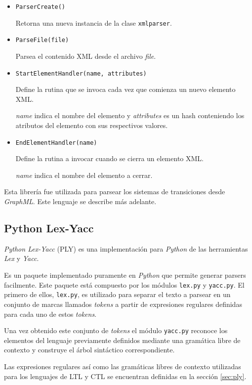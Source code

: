 \begin{itemize}
\item \texttt{ParserCreate()}

Retorna una nueva instancia de la clase \texttt{xmlparser}.

\item \texttt{ParseFile(file)}

Parsea el contenido XML desde el archivo \textit{file}.

\item \texttt{StartElementHandler(name, attributes)}

Define la rutina que se invoca cada vez que comienza un nuevo elemento XML.

\textit{name} indica el nombre del elemento y \textit{attributes} es un hash
 conteniendo los atributos del elemento con sus respectivos valores.

\item \texttt{EndElementHandler(name)}

Define la rutina a invocar cuando se cierra un elemento XML.

\textit{name} indica el nombre del elemento a cerrar.

\end{itemize}

Esta librería fue utilizada para parsear los sistemas de transiciones desde \textit{GraphML}.
Este lenguaje se describe más adelante.

\subsection{Python Lex-Yacc}
\textit{Python Lex-Yacc} (PLY) es una implementación para \textit{Python} de las herramientas
 \textit{Lex} y \textit{Yacc}.

Es un paquete implementado puramente en \textit{Python} que permite generar parsers facilmente.
Este paquete está compuesto por los módulos \texttt{lex.py} y \texttt{yacc.py}.
El primero de ellos, \texttt{lex.py}, es utilizado para separar el texto a parsear en
 un conjunto de marcas llamados \textit{tokens} a partir de expresiones regulares definidas
 para cada uno de estos \textit{tokens}.

Una vez obtenido este conjunto de \textit{tokens} el módulo \texttt{yacc.py} reconoce los
 elementos del lenguaje previamente definidos mediante una gramática libre de contexto y
 construye el árbol sintáctico correspondiente.

Las expresiones regulares así como las gramáticas libres de contexto utilizadas para los
 lenguajes de LTL y CTL se encuentran definidas en la sección \ref{sec:ply}.

